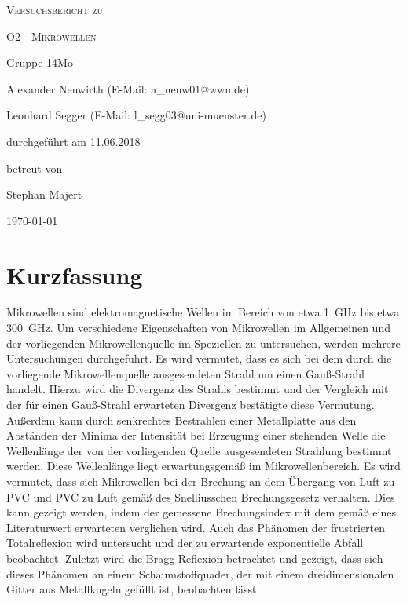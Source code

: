 \documentclass[
	a4paper,
	12pt,
	pagesize,
	ngerman
]{scrartcl}
\begin{document}
	
	\begin{titlepage}
		\centering
		{\scshape\LARGE Versuchsbericht zu \par}
		\vspace{1cm}
		{\scshape\huge O2 - Mikrowellen \par}
		\vspace{2.5cm}
		{\LARGE Gruppe 14Mo \par}
		\vspace{0.5cm}
		
		{\large Alexander Neuwirth (E-Mail: a\_neuw01@wwu.de) \par}
		{\large Leonhard Segger (E-Mail: l\_segg03@uni-muenster.de) \par}
		\vfill
		
		durchgeführt am 11.06.2018\par
		betreut von\par
		{\large Stephan Majert}
		
		\vfill
		
		{\large \today\par}
	\end{titlepage}
	\tableofcontents
	\newpage


	\section{Kurzfassung}
	Mikrowellen sind elektromagnetische Wellen im Bereich von etwa \SI{1}{\giga \Hz} bis etwa \SI{300}{\giga \hertz}.
	Um verschiedene Eigenschaften von Mikrowellen im Allgemeinen und der vorliegenden Mikrowellenquelle im Speziellen zu untersuchen, werden mehrere Untersuchungen durchgeführt. %
	Es wird vermutet, dass es sich bei dem durch die vorliegende Mikrowellenquelle ausgesendeten Strahl um einen Gauß-Strahl handelt.
	Hierzu wird die Divergenz des Strahls bestimmt und der Vergleich mit der für einen Gauß-Strahl erwarteten Divergenz bestätigte diese Vermutung.
	Außerdem kann durch senkrechtes Bestrahlen einer Metallplatte aus den Abständen der Minima der Intensität bei Erzeugung einer stehenden Welle die Wellenlänge der von der vorliegenden Quelle ausgesendeten Strahlung bestimmt werden. %
	Diese Wellenlänge liegt erwartungsgemäß im Mikrowellenbereich.
	Es wird vermutet, dass sich Mikrowellen bei der Brechung an dem Übergang von Luft zu PVC und PVC zu Luft gemäß des Snelliusschen Brechungsgesetz verhalten.
	Dies kann gezeigt werden, indem der gemessene Brechungsindex mit dem gemäß eines Literaturwert erwarteten verglichen wird.
	Auch das Phänomen der frustrierten Totalreflexion wird untersucht und der zu erwartende exponentielle Abfall beobachtet.
	Zuletzt wird die Bragg-Reflexion betrachtet und gezeigt, dass sich dieses Phänomen an einem Schaumstoffquader, der mit einem dreidimensionalen Gitter aus Metallkugeln gefüllt ist, beobachten lässt.
	
\end{document}
